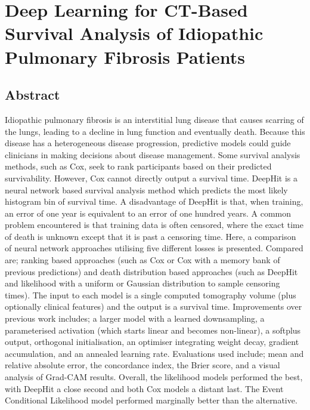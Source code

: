 \chapter{Deep Learning for CT-Based Survival Analysis of Idiopathic Pulmonary Fibrosis Patients} \label{sec:deep_learning_for_ct_based_survival_analysis_of_idiopathic_pulmonary_fibrosis_patients_appendix}
    \newpage

    \section{Abstract} \label{sec:deep_learning_for_ct_based_survival_analysis_of_idiopathic_pulmonary_fibrosis_patients_appendix_abstract}
        Idiopathic pulmonary fibrosis is an interstitial lung disease that causes scarring of the lungs, leading to a decline in lung function and eventually death. Because this disease has a heterogeneous disease progression, predictive models could guide clinicians in making decisions about disease management. Some survival analysis methods, such as Cox, seek to rank participants based on their predicted survivability. However, Cox cannot directly output a survival time. DeepHit is a neural network based survival analysis method which predicts the most likely histogram bin of survival time. A disadvantage of DeepHit is that, when training, an error of one year is equivalent to an error of one hundred years. A common problem encountered is that training data is often censored, where the exact time of death is unknown except that it is past a censoring time. Here, a comparison of neural network approaches utilising five different losses is presented. Compared are; ranking based approaches (such as Cox or Cox with a memory bank of previous predictions) and death distribution based approaches (such as DeepHit and likelihood with a uniform or Gaussian distribution to sample censoring times). The input to each model is a single computed tomography volume (plus optionally clinical features) and the output is a survival time. Improvements over previous work includes; a larger model with a learned downsampling, a parameterised activation (which starts linear and becomes non-linear), a softplus output, orthogonal initialisation, an optimiser integrating weight decay, gradient accumulation, and an annealed learning rate. Evaluations used include; mean and relative absolute error, the concordance index, the Brier score, and a visual analysis of Grad-CAM results. Overall, the likelihood models performed the best, with DeepHit a close second and both Cox models a distant last. The Event Conditional Likelihood model performed marginally better than the alternative.

